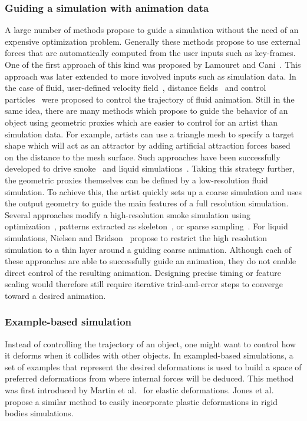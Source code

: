 \subsubsection{Guiding a simulation with animation data}
A large number of methods propose to guide a simulation without the need of an expensive optimization problem. 
Generally these methods propose to use external forces that are automatically computed from the user inputs such as key-frames.
One of the first approach of this kind was proposed by Lamouret and Cani~\cite{Lamouret1996}.
This approach was later extended to more involved inputs such as simulation data.
In the case of fluid, user-defined velocity field~\cite{Kim2006:SmokeControl}, distance fields~\cite{Yang2013} and control particles~\cite{Thurey2006:FluidControl,Madill2013} were proposed to control the trajectory of fluid animation.
Still in the same idea, there are many methods which propose to guide the behavior of an object using geometric proxies which are easier to control for an artist than simulation data. For example, artists can use a triangle mesh to specify a target shape which will act as an attractor by adding artificial attraction forces based on the distance to the mesh surface. 
Such approaches have been successfully developed to drive smoke~\cite{Fattal2004,Hong2004,Shi2005a} and liquid simulations~\cite{Shi2005b,Raveendran2012}.
Taking this strategy further, the geometric proxies themselves can be defined by a low-resolution fluid simulation. 
To achieve this, the artist quickly sets up a coarse simulation and uses the output geometry to guide the main features of a full resolution simulation.
Several approaches modify a high-resolution smoke simulation using optimization~\cite{Nielsen2009,Nielsen2010}, patterns extracted as skeleton~\cite{Yuan2011}, or sparse sampling~\cite{Huang2013}.
For liquid simulations, Nielsen and Bridson~\cite{Nielsen2011} propose to restrict the high resolution simulation to a thin layer around a guiding coarse animation.
Although each of these approaches are able to successfully guide an animation, they do not enable direct control of the resulting animation. Designing precise timing or feature scaling would therefore still require iterative trial-and-error steps to converge toward a desired animation.

\subsubsection{Example-based simulation}
Instead of controlling the trajectory of an object, one might want to control how it deforms when it collides with other objects. 
In exampled-based simulations, a set of examples that represent the desired deformations is used to build a space of preferred deformations from where internal forces will be deduced. This method was first introduced by Martin et al.~\cite{Martin2011} for elastic deformations. Jones et al.~\cite{Jones2016} propose a similar method to easily incorporate plastic deformations in rigid bodies simulations.

